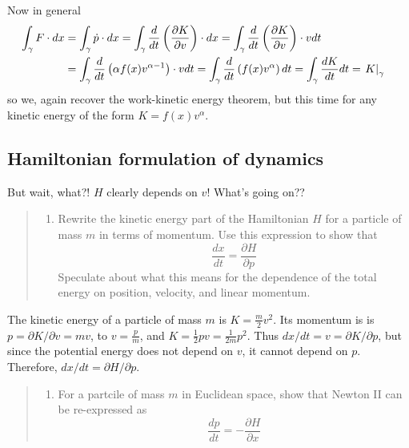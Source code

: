 \documentclass[
  letterpaper,
  DIV=11,
  numbers=noendperiod]{scrartcl}
\providecommand{\tightlist}{%
  \setlength{\itemsep}{0pt}\setlength{\parskip}{0pt}}
\begin{document}
Now in general \begin{align}
\int_\gamma F\cdot dx &= \int_\gamma \dot p \cdot dx 
= \int_\gamma \frac d{dt}\left(\frac{\partial K}{\partial v}\right) \cdot dx 
= \int_\gamma \frac d{dt}\left(\frac{\partial K}{\partial v}\right) \cdot vdt \cr
&= \int_\gamma \frac d{dt}\left(\alpha f(x)v^{\alpha -1}\right) \cdot vdt
= \int_\gamma \frac d{dt}\left(f(x)v^\alpha\right)dt
= \int_\gamma \frac {dK}{dt}dt
=\left.K\right|_\gamma
\end{align} so we, again recover the work-kinetic energy theorem, but
this time for any kinetic energy of the form \(K=f(x)v^\alpha\).

\subsection{Hamiltonian formulation of
dynamics}\label{hamiltonian-formulation-of-dynamics}

But wait, what?! \(H\) clearly depends on \(v\)! What's going on??

\begin{quote}
\begin{enumerate}
\def\labelenumi{\arabic{enumi}.}
\setcounter{enumi}{3}
\tightlist
\item
  Rewrite the kinetic energy part of the Hamiltonian \(H\) for a
  particle of mass \(m\) in terms of momentum. Use this expression to
  show that \[
  \frac{d x}{dt} = \frac{\partial H}{\partial p}
  \] Speculate about what this means for the dependence of the total
  energy on position, velocity, and linear momentum.
\end{enumerate}
\end{quote}

The kinetic energy of a particle of mass \(m\) is \(K=\frac m2 v^2\).
Its momentum is is \(p=\partial K/\partial v=mv\), to \(v=\frac pm\),
and \(K=\frac12 pv=\frac1{2m}p^2\). Thus
\(dx/dt=v=\partial K/\partial p\), but since the potential energy does
not depend on \(v\), it cannot depend on \(p\). Therefore,
\(dx/dt=\partial H/\partial p\).

\begin{quote}
\begin{enumerate}
\def\labelenumi{\arabic{enumi}.}
\setcounter{enumi}{5}
\tightlist
\item
  For a partcile of mass \(m\) in Euclidean space, show that Newton II
  can be re-expressed as \[
  \frac{d p}{dt} = -\frac {\partial H}{\partial x}
  \]
\end{enumerate}
\end{quote}
\end{document}
